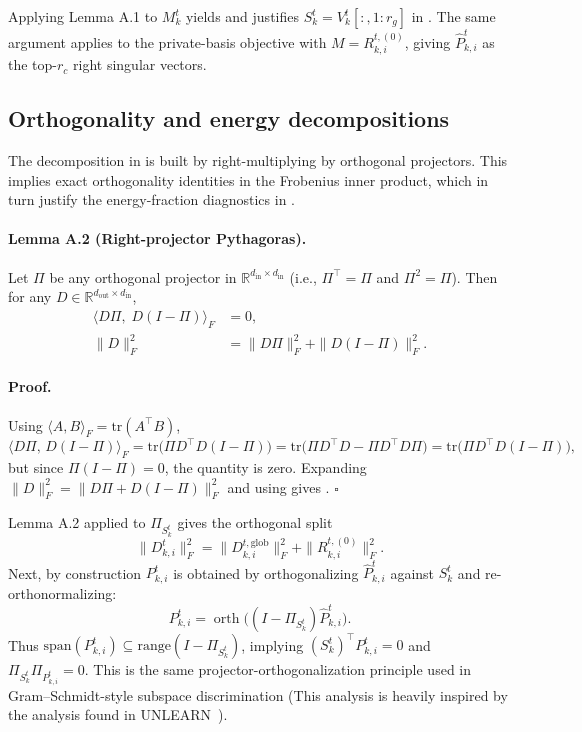 \documentclass{article}
\theoremstyle{plain}
\theoremstyle{definition}
\theoremstyle{remark}
\begin{document}
Applying Lemma A.1 to $M_k^t$ yields  and justifies $S_k^t=V_k^t[:,1{:}r_g]$ in . The same argument applies to the private-basis objective  with $M=R_{k,i}^{t,(0)}$, giving $\hat P_{k,i}^t$ as the top-$r_c$ right singular vectors.

\subsection{Orthogonality and energy decompositions}
\label{sec:appendix-orthogonality}

The decomposition in  is built by right-multiplying by orthogonal projectors. This implies exact orthogonality identities in the Frobenius inner product, which in turn justify the energy-fraction diagnostics in .

\paragraph{Lemma A.2 (Right-projector Pythagoras).}
Let $\Pi$ be any orthogonal projector in $\mathbb{R}^{d_{\mathrm{in}}\times d_{\mathrm{in}}}$ (i.e., $\Pi^\top=\Pi$ and $\Pi^2=\Pi$). Then for any $D\in\mathbb{R}^{d_{\mathrm{out}}\times d_{\mathrm{in}}}$,
\begin{align}
\langle D\Pi,\; D(I-\Pi)\rangle_F &= 0,
\label{eq:appendix-cross0}\\
\|D\|_F^2 &= \|D\Pi\|_F^2 + \|D(I-\Pi)\|_F^2.
\label{eq:appendix-pythag}
\end{align}

\paragraph{Proof.}
Using $\langle A,B\rangle_F=\mathrm{tr}(A^\top B)$,
\[
\langle D\Pi,\,D(I-\Pi)\rangle_F
= \mathrm{tr}\!\big(\Pi D^\top D(I-\Pi)\big)
= \mathrm{tr}\!\big(\Pi D^\top D - \Pi D^\top D\Pi\big)
= \mathrm{tr}\!\big(\Pi D^\top D(I-\Pi)\big),
\]
but since $\Pi(I-\Pi)=0$, the quantity is zero. Expanding $\|D\|_F^2=\|D\Pi + D(I-\Pi)\|_F^2$ and using  gives . \hfill$\square$

Lemma A.2 applied to $\Pi_{S_k^t}$ gives the orthogonal split
\[
\|D_{k,i}^t\|_F^2
= \|D_{k,i}^{t,\mathrm{glob}}\|_F^2 + \|R_{k,i}^{t,(0)}\|_F^2.
\]
Next, by construction $P_{k,i}^t$ is obtained by orthogonalizing $\hat P_{k,i}^t$ against $S_k^t$ and re-orthonormalizing:
\[
P_{k,i}^t = \operatorname{orth}\!\big((I-\Pi_{S_k^t})\hat P_{k,i}^t\big).
\]
Thus $\mathrm{span}(P_{k,i}^t)\subseteq \mathrm{range}(I-\Pi_{S_k^t})$, implying $(S_k^t)^\top P_{k,i}^t = 0$ and $\Pi_{S_k^t}\Pi_{P_{k,i}^t}=0$. This is the same projector-orthogonalization principle used in Gram--Schmidt-style subspace discrimination (This analysis is heavily inspired by the analysis found in UNLEARN~\citet{lizzo2024unlearn}).
\end{document}
